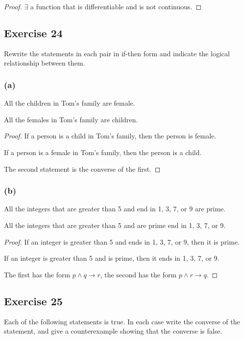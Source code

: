 \documentclass[14pt]{extarticle}
\newcommand{\te}{\exists}
\begin{document}
\begin{proof}
    $\te$ a function that is differentiable and is not continuous.
\end{proof}

\subsection{Exercise 24}
Rewrite the statements in each pair in if-then form and indicate the logical relationship between them.

\subsubsection{(a)}
All the children in Tom’s family are female.

All the females in Tom’s family are children.

\begin{proof}
    If a person is a child in Tom’s family, then the person is female.

    If a person is a female in Tom’s family, then the person is a child.

    The second statement is the converse of the first.
\end{proof}

\subsubsection{(b)}
All the integers that are greater than 5 and end in 1, 3, 7, or 9 are prime.

All the integers that are greater than 5 and are prime end in 1, 3, 7, or 9.

\begin{proof}
    If an integer is greater than 5 and ends in 1, 3, 7, or 9, then it is prime.

    If an integer is greater than 5 and is prime, then it ends in 1, 3, 7, or 9.

    The first has the form $p \wedge q \to r$, the second has the form $p \wedge r \to q$.
\end{proof}

\subsection{Exercise 25}
Each of the following statements is true. In each case write the converse of the statement, and give a counterexample showing that the converse is false.
\end{document}

